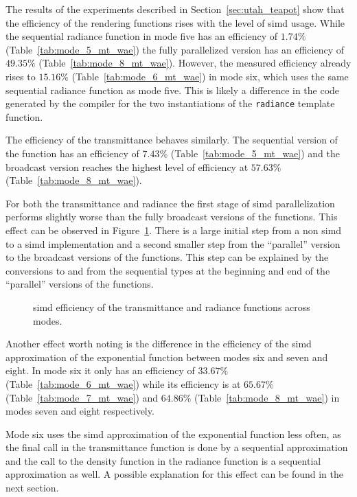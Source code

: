 \documentclass[a4paper, 11pt]{memoir}
\begin{document}
    The results of the experiments described in Section~\ref{sec:utah_teapot} show that the efficiency of the rendering
    functions rises with the level of \gls{simd} usage. While the sequential \gls{radiance} function in mode five has
    an efficiency of $1.74\%$ (Table~\ref{tab:mode_5_mt_wae}) the fully parallelized version has an efficiency of $49.35\%$
    (Table~\ref{tab:mode_8_mt_wae}). However, the measured efficiency already rises to $15.16\%$ (Table~\ref{tab:mode_6_mt_wae})
    in mode six, which uses the same sequential radiance function as mode five. This is likely a difference in the code
    generated by the compiler for the two instantiations of the \texttt{radiance} template function.

    The efficiency of the \gls{transmittance} behaves similarly. The sequential version of the function has an efficiency
    of $7.43\%$ (Table~\ref{tab:mode_5_mt_wae}) and the broadcast version reaches the highest level of efficiency at
    $57.63\%$ (Table~\ref{tab:mode_8_mt_wae}).

    For both the \gls{transmittance} and \gls{radiance} the first stage of \gls{simd} parallelization performs slightly
    worse than the fully broadcast versions of the functions. This effect can be observed in Figure~\ref{fig:efficiency}.
    There is a large initial step from a non \gls{simd} to a \gls{simd} implementation and a second smaller step from
    the \enquote{parallel} version to the broadcast versions of the functions. This step can be explained by the
    conversions to and from the sequential types at the beginning and end of the \enquote{parallel} versions of the
    functions.

    \begin{figure}[t]
        \centering
        
        \caption{\gls{simd} efficiency of the \gls{transmittance} and \gls{radiance} functions across modes.}
        \label{fig:efficiency}
    \end{figure}

    Another effect worth noting is the difference in the efficiency of the \gls{simd} approximation of the exponential
    function between modes six and seven and eight. In mode six it only has an efficiency of $33.67\%$
    (Table~\ref{tab:mode_6_mt_wae}) while its efficiency is at $65.67\%$ (Table~\ref{tab:mode_7_mt_wae}) and $64.86\%$
    (Table~\ref{tab:mode_8_mt_wae}) in modes seven and eight respectively.

    Mode six uses the \gls{simd} approximation of the exponential function less often, as the final call in the
    \gls{transmittance} function is done by a sequential approximation and the call to the density function in the
    \gls{radiance} function is a sequential approximation as well. A possible explanation for this effect can be found
    in the next section.
\end{document}
